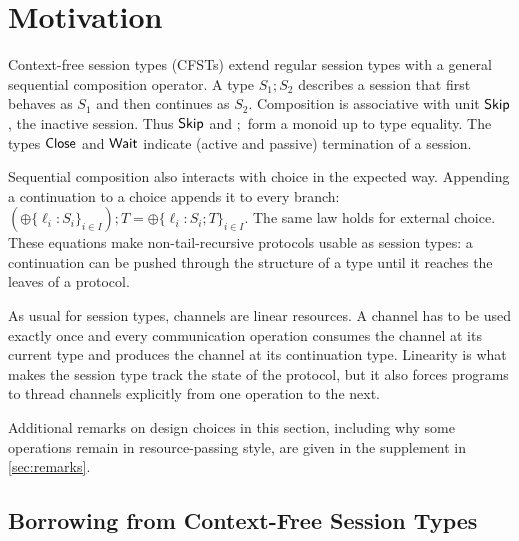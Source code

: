 \newcommand\linenoreset[1][1]{%
  \defcounter{lineno@num}{#1 - 1}%
}

\EndFmtInput














\section{Motivation}
\label{sec:motivation}

Context-free session types (CFSTs) extend regular session types with a general
sequential composition operator. A type $S_1;S_2$ describes a session that first
behaves as $S_1$ and then continues as $S_2$.  Composition is associative with
unit \ensuremath{\CodeTy{Skip}}, the inactive session.  Thus \ensuremath{\CodeTy{Skip}} and \ensuremath{\mathop{;}} form a monoid up to type
equality. The types \ensuremath{\CodeTy{Close}} and \ensuremath{\CodeTy{Wait}} indicate (active and passive) termination
of a session.

Sequential composition also interacts with choice in the expected way.
Appending a continuation to a choice appends it to every branch:
$(\oplus\{\ell_i:S_i\}_{i\in I});T =
\oplus\{\ell_i:S_i;T\}_{i\in I}$. The same law holds for external
choice. These equations make non-tail-recursive protocols
usable as session types: a continuation can be pushed through
the structure of a type until it reaches the leaves of a protocol.

As usual for session types, channels are linear resources. A channel
has to be used exactly once and every communication operation consumes
the channel at its current type and produces the channel at its
continuation type. Linearity is what makes the session type track the
state of the protocol, but it also forces programs to thread channels
explicitly from one operation to the next.

Additional remarks on design choices in this section, including why
some operations remain in resource-passing style, are given in the
supplement in \cref{sec:remarks}.

\subsection{Borrowing from Context-Free Session Types}
\label{sec:borr-from-cont}

